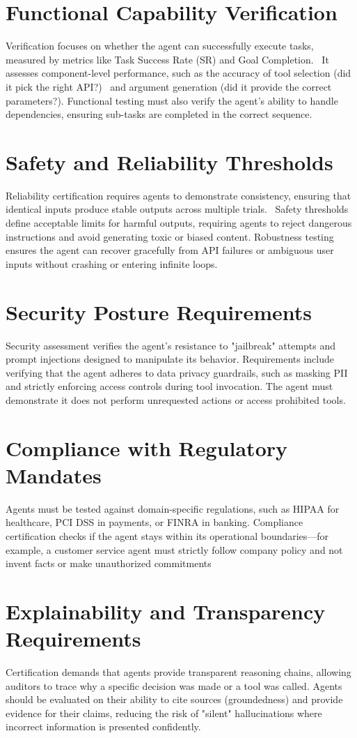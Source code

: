 \begin{TNtwocol}
\section{Functional Capability Verification}
Verification focuses on whether the agent can successfully execute tasks, measured by metrics like Task Success Rate (SR) and Goal Completion.~\cite{Mohammadi_2025} It assesses component-level performance, such as the accuracy of tool selection (did it pick the right API?)~\cite{deepeval_ai_agent_evaluation, Mohammadi_2025} and argument generation (did it provide the correct parameters?). Functional testing must also verify the agent's ability to handle dependencies, ensuring sub-tasks are completed in the correct sequence.~\cite{deepeval_ai_agent_evaluation}
\section{Safety and Reliability Thresholds}
Reliability certification requires agents to demonstrate consistency, ensuring that identical inputs produce stable outputs across multiple trials.~\cite{Mohammadi_2025} Safety thresholds define acceptable limits for harmful outputs, requiring agents to reject dangerous instructions and avoid generating toxic or biased content. Robustness testing ensures the agent can recover gracefully from API failures or ambiguous user inputs without crashing or entering infinite loops.
\section{Security Posture Requirements }
Security assessment verifies the agent's resistance to "jailbreak" attempts and prompt injections designed to manipulate its behavior. Requirements include verifying that the agent adheres to data privacy guardrails, such as masking PII and strictly enforcing access controls during tool invocation. The agent must demonstrate it does not perform unrequested actions or access prohibited tools.
\section{Compliance with Regulatory Mandates}
Agents must be tested against domain-specific regulations, such as HIPAA for healthcare, PCI DSS in payments, or FINRA in banking. Compliance certification checks if the agent stays within its operational boundaries—for example, a customer service agent must strictly follow company policy and not invent facts or make unauthorized commitments
\section{Explainability and Transparency Requirements}
Certification demands that agents provide transparent reasoning chains, allowing auditors to trace why a specific decision was made or a tool was called. Agents should be evaluated on their ability to cite sources (groundedness) and provide evidence for their claims, reducing the risk of "silent" hallucinations where incorrect information is presented confidently.

\end{TNtwocol}
